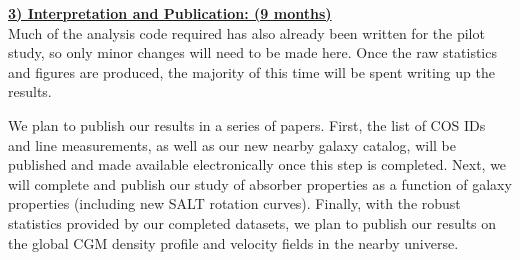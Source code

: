 \documentclass[12pt]{article}
\begin{document}
\noindent \textbf{\underline{3) Interpretation and Publication: (9 months)}}\\
\indent Much of the analysis code required has also already been written for the pilot study, so only minor changes will need to be made here. Once the raw statistics and figures are produced, the majority of this time will be spent writing up the results. 

We plan to publish our results in a series of papers. First, the list of COS IDs and line measurements, as well as our new nearby galaxy catalog, will be published and made available electronically once this step is completed. Next, we will complete and publish our study of absorber properties as a function of galaxy properties (including new SALT rotation curves). Finally, with the robust statistics provided by our completed datasets, we plan to publish our results on the global CGM density profile and velocity fields in the nearby universe.
\end{document}
